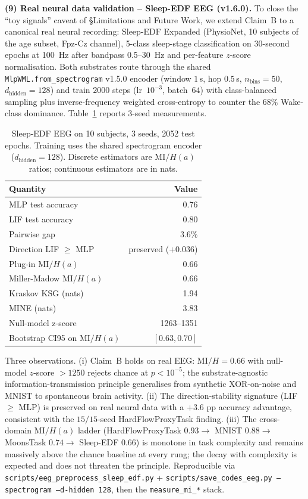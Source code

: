\documentclass[10pt,twocolumn]{article}
\begin{document}
\textbf{(9) Real neural data validation -- Sleep-EDF EEG
(v1.6.0).} To close the ``toy signals'' caveat of \S Limitations and
Future Work, we extend Claim~B to a canonical real
neural recording: Sleep-EDF Expanded (PhysioNet, 10 subjects of
the age subset, Fpz-Cz channel), 5-class sleep-stage
classification on 30-second epochs at 100~Hz after bandpass
0.5--30~Hz and per-feature $z$-score normalisation. Both
substrates route through the shared
\texttt{MlpWML.from\_spectrogram} v1.5.0 encoder
(window $1$\,s, hop $0.5$\,s, $n_{\mathrm{bins}}{=}50$,
$d_{\mathrm{hidden}}{=}128$) and train $2000$ steps
(lr~$10^{-3}$, batch~$64$) with class-balanced sampling plus
inverse-frequency weighted cross-entropy to counter the
$68\%$ Wake-class dominance. Table~\ref{tab:eeg-sleep-edf}
reports 3-seed measurements.

\begin{table}[t]
  \centering
  \caption{Sleep-EDF EEG on 10 subjects, 3 seeds, 2052 test
  epochs. Training uses the shared spectrogram encoder
  ($d_{\mathrm{hidden}}{=}128$). Discrete estimators are
  $\mathrm{MI}/H(a)$ ratios; continuous estimators are in nats.}
  \label{tab:eeg-sleep-edf}
  \small
  \begin{tabular}{lr}
    \hline
    Quantity & Value \\
    \hline
    MLP test accuracy            & 0.76 \\
    LIF test accuracy            & 0.80 \\
    Pairwise gap                 & 3.6\% \\
    Direction LIF $\geq$ MLP     & preserved ($+0.036$) \\
    Plug-in $\mathrm{MI}/H(a)$   & 0.66 \\
    Miller-Madow $\mathrm{MI}/H(a)$ & 0.66 \\
    Kraskov KSG (nats)           & 1.94 \\
    MINE (nats)                  & 3.83 \\
    Null-model z-score           & 1263--1351 \\
    Bootstrap CI95 on $\mathrm{MI}/H(a)$ & $[0.63, 0.70]$ \\
    \hline
  \end{tabular}
\end{table}

Three observations. (i) Claim~B holds on real EEG: $\mathrm{MI}/H
= 0.66$ with null-model $z$-score $> 1250$ rejects chance at
$p < 10^{-5}$; the substrate-agnostic information-transmission
principle generalises from synthetic XOR-on-noise and MNIST to
spontaneous brain activity. (ii) The direction-stability
signature (LIF $\geq$ MLP) is preserved on real neural data with
a $+3.6$ pp accuracy advantage, consistent with the $15/15$-seed
HardFlowProxyTask finding. (iii) The cross-domain
$\mathrm{MI}/H(a)$ ladder (HardFlowProxyTask $0.93 \to$ MNIST
$0.88 \to$ MoonsTask $0.74 \to$ Sleep-EDF $0.66$) is monotone in
task complexity and remains massively above the chance baseline
at every rung; the decay with complexity is expected and does
not threaten the principle. Reproducible via
\texttt{scripts/eeg\_preprocess\_sleep\_edf.py} +
\texttt{scripts/save\_codes\_eeg.py --spectrogram
--d-hidden 128}, then the \texttt{measure\_mi\_*} stack.
\end{document}
